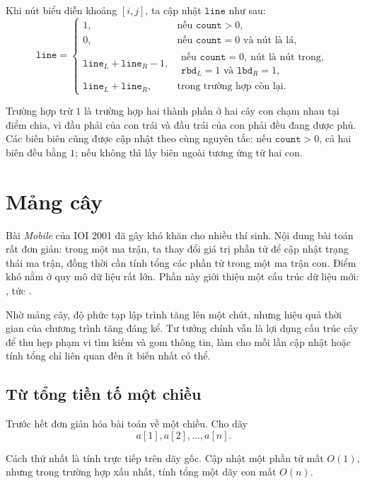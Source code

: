 \documentclass[11pt]{article}
\begin{document}
Khi nút biểu diễn khoảng \([i,j]\), ta cập nhật \(\texttt{line}\) như sau:
\[
\texttt{line} =
\begin{cases}
  1, & \text{nếu } \texttt{count}>0,\\
  0, & \text{nếu } \texttt{count}=0 \text{ và nút là lá},\\
  \texttt{line}_{L}+\texttt{line}_{R}-1,
    & \begin{array}{l}
      \text{nếu } \texttt{count}=0,\ \text{nút là nút trong,}\\
      \texttt{rbd}_{L}=1 \text{ và } \texttt{lbd}_{R}=1,
    \end{array}\\
  \texttt{line}_{L}+\texttt{line}_{R},
    & \text{trong trường hợp còn lại.}
\end{cases}
\]

Trường hợp trừ \(1\) là trường hợp hai thành phần ở hai cây con chạm nhau tại
điểm chia, vì đầu phải của con trái và đầu trái của con phải đều đang được
phủ. Các biến biên cũng được cập nhật theo cùng nguyên tắc: nếu
\(\texttt{count}>0\), cả hai biên đều bằng \(1\); nếu không thì lấy biên
ngoài tương ứng từ hai con.

\section{Mảng cây}

Bài \emph{Mobile} của IOI 2001 đã gây khó khăn cho nhiều thí sinh. Nội dung
bài toán rất đơn giản: trong một ma trận, ta thay đổi giá trị phần tử để cập
nhật trạng thái ma trận, đồng thời cần tính tổng các phần tử trong một ma
trận con. Điểm khó nằm ở quy mô dữ liệu rất lớn. Phần này giới thiệu một cấu
trúc dữ liệu mới: , tức .

Nhờ mảng cây, độ phức tạp lập trình tăng lên một chút, nhưng hiệu quả thời
gian của chương trình tăng đáng kể. Tư tưởng chính vẫn là lợi dụng cấu trúc
cây để thu hẹp phạm vi tìm kiếm và gom thông tin, làm cho mỗi lần cập nhật
hoặc tính tổng chỉ liên quan đến ít biến nhất có thể.

\subsection{Từ tổng tiền tố một chiều}

Trước hết đơn giản hóa bài toán về một chiều. Cho dãy
\[
  a[1],a[2],\ldots,a[n].
\]

Cách thứ nhất là tính trực tiếp trên dãy gốc. Cập nhật một phần tử mất
\(O(1)\), nhưng trong trường hợp xấu nhất, tính tổng một dãy con mất \(O(n)\).
\end{document}
